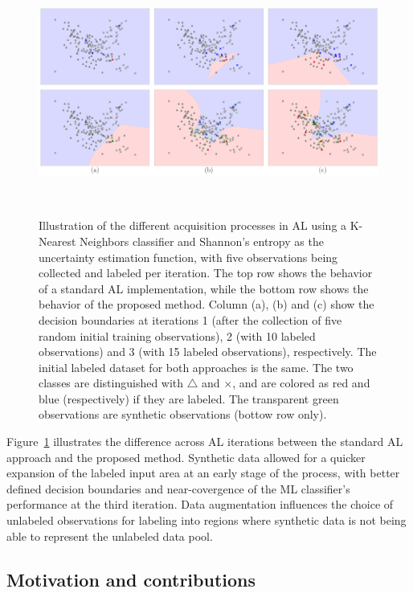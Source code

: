 \begin{figure}[t]
	\centering
	\includegraphics[width=\linewidth]{al-example}
    \caption[Illustration of the different acquisition processes in AL.]{%
        Illustration of the different acquisition processes in AL using a
        K-Nearest Neighbors classifier and Shannon's entropy as the
        uncertainty estimation function, with five observations being
        collected and labeled per iteration. The top row shows the behavior of
        a standard AL implementation, while the bottom row shows the behavior
        of the proposed method. Column (a), (b) and (c) show the decision
        boundaries at iterations 1 (after the collection of five random
        initial training observations), 2 (with 10 labeled observations) and 3
        (with 15 labeled observations), respectively. The initial labeled
        dataset for both approaches is the same. The two classes are
        distinguished with $\triangle$ and $\times$, and are colored as red
        and blue (respectively) if they are labeled. The transparent green
        observations are synthetic observations (bottow row only).
    }~\label{fig:al-example}
\end{figure}

Figure~\ref{fig:al-example} illustrates the difference across AL
iterations between the standard AL approach and the proposed method. Synthetic
data allowed for a quicker expansion of the labeled input area at an early
stage of the process, with better defined decision boundaries and
near-covergence of the ML classifier's performance at the third iteration.
Data augmentation influences the choice of unlabeled observations for labeling
into regions where synthetic data is not being able to represent the unlabeled
data pool.
 
\subsection{Motivation and contributions}


